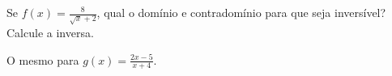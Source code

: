 Se $f(x)=\frac{8}{\sqrt{x}+2}$, qual o domínio e contradomínio para que seja inversível?
Calcule a inversa.

O mesmo para $g(x)=\frac{2x-5}{x+4}$.
